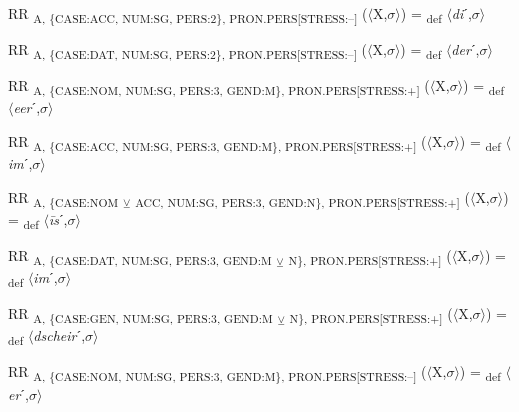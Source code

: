 {\begin{exe}
 RR \textsubscript{A, \{CASE:ACC, NUM:SG, PERS:2\}, PRON.PERS[STRESS:–]} ($\langle$X,$\sigma $$\rangle$) = \textsubscript{def} $\langle$\textit{di}ˊ,$\sigma $$\rangle$
\end{exe}

\begin{exe}
 RR \textsubscript{A, \{CASE:DAT, NUM:SG, PERS:2\}, PRON.PERS[STRESS:–]} ($\langle$X,$\sigma $$\rangle$) = \textsubscript{def} $\langle$\textit{der}ˊ,$\sigma $$\rangle$
\end{exe}

\begin{exe}
 RR \textsubscript{A, \{CASE:NOM, NUM:SG, PERS:3, GEND:M\}, PRON.PERS[STRESS:+]} ($\langle$X,$\sigma $$\rangle$) = \textsubscript{def} $\langle$\textit{eer}ˊ,$\sigma $$\rangle$
\end{exe}

\begin{exe}
 RR \textsubscript{A, \{CASE:ACC, NUM:SG, PERS:3, GEND:M\}, PRON.PERS[STRESS:+]} ($\langle$X,$\sigma $$\rangle$) = \textsubscript{def} $\langle$\textit{im}ˊ,$\sigma $$\rangle$
\end{exe}

\begin{exe}
 RR \textsubscript{A, \{CASE:NOM} \textsubscript{${\veebar}$}\textsubscript{ ACC, NUM:SG, PERS:3, GEND:N\}, PRON.PERS[STRESS:+]} ($\langle$X,$\sigma $$\rangle$) = \textsubscript{def} $\langle$\textit{\=is}ˊ,$\sigma $$\rangle$
\end{exe}

\begin{exe}
 RR \textsubscript{A, \{CASE:DAT, NUM:SG, PERS:3, GEND:M} \textsubscript{${\veebar}$}\textsubscript{ N\}, PRON.PERS[STRESS:+]} ($\langle$X,$\sigma $$\rangle$) = \textsubscript{def} $\langle$\textit{im}ˊ,$\sigma $$\rangle$
\end{exe}

\begin{exe}
 RR \textsubscript{A, \{CASE:GEN, NUM:SG, PERS:3, GEND:M} \textsubscript{${\veebar}$}\textsubscript{ N\}, PRON.PERS[STRESS:+]} ($\langle$X,$\sigma $$\rangle$) = \textsubscript{def} $\langle$\textit{dscheir}ˊ,$\sigma $$\rangle$
\end{exe}

\begin{exe}
 RR \textsubscript{A, \{CASE:NOM, NUM:SG, PERS:3, GEND:M\}, PRON.PERS[STRESS:–]} ($\langle$X,$\sigma $$\rangle$) = \textsubscript{def} $\langle$\textit{er}ˊ,$\sigma $$\rangle$
\end{exe}

}
